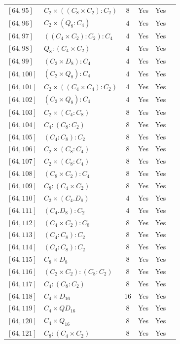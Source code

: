 \documentclass[12pt, a4paper]{article}
\theoremstyle{plain}
\theoremstyle{definition}
\begin{document}
\begin{longtable}{llcccl}
  $[64,95]$ & $C_2 \times ((C_8 \times C_2) : C_2)$ & 8 & Yes & Yes \\
  $[64,96]$ & $C_2 \times (Q_8 : C_4)$ & 4 & Yes & Yes \\
  $[64,97]$ & $((C_4 \times C_2) : C_2) : C_4$ & 4 & Yes & Yes \\
  $[64,98]$ & $Q_8 : (C_4 \times C_2)$ & 4 & Yes & Yes \\
  $[64,99]$ & $(C_2 \times D_8) : C_4$ & 4 & Yes & Yes \\
  $[64,100]$ & $(C_2 \times Q_8) : C_4$ & 4 & Yes & Yes \\
  $[64,101]$ & $C_2 \times ((C_4 \times C_4) : C_2)$ & 4 & Yes & Yes \\
  $[64,102]$ & $(C_2 \times Q_8) : C_4$ & 4 & Yes & Yes \\
  $[64,103]$ & $C_2 \times (C_4 : C_8)$ & 8 & Yes & Yes \\
  $[64,104]$ & $C_4 : (C_8 : C_2)$ & 8 & Yes & Yes \\
  $[64,105]$ & $(C_4 : C_8) : C_2$ & 8 & Yes & Yes \\
  $[64,106]$ & $C_2 \times (C_8 : C_4)$ & 8 & Yes & Yes \\
  $[64,107]$ & $C_2 \times (C_8 : C_4)$ & 8 & Yes & Yes \\
  $[64,108]$ & $(C_8 \times C_2) : C_4$ & 8 & Yes & Yes \\
  $[64,109]$ & $C_8 : (C_4 \times C_2)$ & 8 & Yes & Yes \\
  $[64,110]$ & $C_2 \times (C_4 . D_8)$ & 4 & Yes & Yes \\
  $[64,111]$ & $(C_4 . D_8) : C_2$ & 4 & Yes & Yes \\
  $[64,112]$ & $(C_4 \times C_2) : C_8$ & 8 & Yes & Yes \\
  $[64,113]$ & $(C_4 : C_8) : C_2$ & 8 & Yes & Yes \\
  $[64,114]$ & $(C_4 : C_8) : C_2$ & 8 & Yes & Yes \\
  $[64,115]$ & $C_8 \times D_8$ & 8 & Yes & Yes \\
  $[64,116]$ & $(C_2 \times C_2) : (C_8 : C_2)$ & 8 & Yes & Yes \\
  $[64,117]$ & $C_4 : (C_8 : C_2)$ & 8 & Yes & Yes \\
  $[64,118]$ & $C_4 \times D_{16}$ & 16 & Yes & Yes \\
  $[64,119]$ & $C_4 \times QD_{16}$ & 8 & Yes & Yes \\
  $[64,120]$ & $C_4 \times Q_{16}$ & 8 & Yes & Yes \\
  $[64,121]$ & $C_8 : (C_4 \times C_2)$ & 8 & Yes & Yes \\

\end{longtable}
\end{document}
